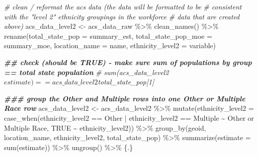 \documentclass[
]{article}
\newenvironment{Shaded}{\begin{snugshade}}{\end{snugshade}}
\newcommand{\AttributeTok}[1]{\textcolor[rgb]{0.77,0.63,0.00}{#1}}
\newcommand{\CommentTok}[1]{\textcolor[rgb]{0.56,0.35,0.01}{\textit{#1}}}
\newcommand{\ConstantTok}[1]{\textcolor[rgb]{0.00,0.00,0.00}{#1}}
\newcommand{\DocumentationTok}[1]{\textcolor[rgb]{0.56,0.35,0.01}{\textbf{\textit{#1}}}}
\newcommand{\FunctionTok}[1]{\textcolor[rgb]{0.00,0.00,0.00}{#1}}
\newcommand{\NormalTok}[1]{#1}
\newcommand{\OtherTok}[1]{\textcolor[rgb]{0.56,0.35,0.01}{#1}}
\newcommand{\SpecialCharTok}[1]{\textcolor[rgb]{0.00,0.00,0.00}{#1}}
\newcommand{\StringTok}[1]{\textcolor[rgb]{0.31,0.60,0.02}{#1}}
\begin{document}
\begin{Shaded}
\begin{Highlighting}[]
\CommentTok{\# clean / reformat the acs data (the data will be formatted to be }
\CommentTok{\# consistent with the "level 2" ethnicity groupings in the workforce }
\CommentTok{\# data that are created above)}
\NormalTok{acs\_data\_level2 }\OtherTok{\textless{}{-}}\NormalTok{ acs\_data\_raw }\SpecialCharTok{\%\textgreater{}\%} 
    \FunctionTok{clean\_names}\NormalTok{() }\SpecialCharTok{\%\textgreater{}\%} 
    \FunctionTok{rename}\NormalTok{(}\AttributeTok{total\_state\_pop =}\NormalTok{ summary\_est, }
           \AttributeTok{total\_state\_pop\_moe =}\NormalTok{ summary\_moe,}
           \AttributeTok{location\_name =}\NormalTok{ name,}
           \AttributeTok{ethnicity\_level2 =}\NormalTok{ variable)}

    \DocumentationTok{\#\# check (should be TRUE) {-} make sure sum of populations by group == total state population}
    \CommentTok{\# sum(acs\_data\_level2$estimate) == acs\_data\_level2$total\_state\_pop[1]}

\DocumentationTok{\#\#\# group the \textquotesingle{}Other\textquotesingle{} and \textquotesingle{}Multiple\textquotesingle{} rows into one \textquotesingle{}Other or Multiple Race\textquotesingle{} row}
\NormalTok{acs\_data\_level2 }\OtherTok{\textless{}{-}}\NormalTok{ acs\_data\_level2 }\SpecialCharTok{\%\textgreater{}\%} 
    \FunctionTok{mutate}\NormalTok{(}\AttributeTok{ethnicity\_level2 =} 
               \FunctionTok{case\_when}\NormalTok{(ethnicity\_level2 }\SpecialCharTok{==} \StringTok{\textquotesingle{}Other\textquotesingle{}} \SpecialCharTok{|} 
\NormalTok{                             ethnicity\_level2 }\SpecialCharTok{==} \StringTok{\textquotesingle{}Multiple\textquotesingle{}} \SpecialCharTok{\textasciitilde{}} 
                             \StringTok{\textquotesingle{}Other or Multiple Race\textquotesingle{}}\NormalTok{,}
                         \ConstantTok{TRUE} \SpecialCharTok{\textasciitilde{}}\NormalTok{ ethnicity\_level2)) }\SpecialCharTok{\%\textgreater{}\%} 
    \FunctionTok{group\_by}\NormalTok{(geoid, location\_name, ethnicity\_level2, total\_state\_pop) }\SpecialCharTok{\%\textgreater{}\%} 
    \FunctionTok{summarize}\NormalTok{(}\AttributeTok{estimate =} \FunctionTok{sum}\NormalTok{(estimate)) }\SpecialCharTok{\%\textgreater{}\%}
    \FunctionTok{ungroup}\NormalTok{() }\SpecialCharTok{\%\textgreater{}\%} 
\NormalTok{    \{.\}}
\end{Highlighting}
\end{Shaded}
\end{document}
